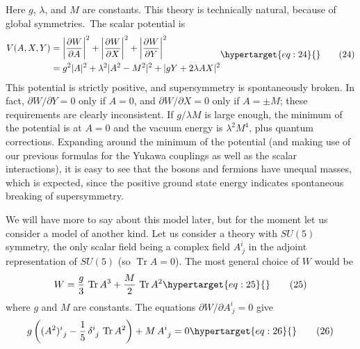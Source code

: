 \documentclass[11pt,a4paper]{article}
\newcommand{\eqtarget}[1]{\hypertarget{eq:#1}{\mathstrut}\tag{#1}}
\begin{document}
Here $g$, $\lambda$, and $M$ are constants. This theory is technically natural,
because of global symmetries.\begingroup\renewcommand{\thefootnote}{\fnsymbol{footnote}}\footnotemark[1]\endgroup\ The scalar potential is
\begin{equation}
\begin{aligned}
V(A, X, Y) &= \left|\frac{\partial W}{\partial A}\right|^2 + \left|\frac{\partial W}{\partial X}\right|^2 + \left|\frac{\partial W}{\partial Y}\right|^2 \\
&= g^2 |A|^2 + \lambda^2 |A^2 - M^2|^2 + |gY + 2 \lambda A X|^2
\end{aligned}
\eqtarget{24}
\end{equation}
This potential is strictly positive, and supersymmetry is spontaneously
broken. In fact, $\partial W/\partial Y = 0$ only if $A = 0$, and $\partial W/\partial X = 0$
only if $A = \pm M$; these requirements are clearly inconsistent. If
$g/\lambda M$ is large enough, the minimum of the potential is at $A = 0$ and
the vacuum energy is $\lambda^2 M^4$, plus quantum corrections. Expanding
around the minimum of the potential (and making use of our previous
formulas for the Yukawa couplings as well as the scalar interactions),
it is easy to see that the bosons and fermions have unequal masses,
which is expected, since the positive ground state energy indicates
spontaneous breaking of supersymmetry.

We will have more to say about this model later, but for the
moment let us consider a model of another kind. Let us consider a
theory with $SU(5)$ symmetry, the only scalar field being a complex
field $A^i_{\ j}$ in the adjoint representation of $SU(5)$ (so $\operatorname{Tr} A = 0$). The
most general choice of $W$ would be
\begin{equation}
W = \frac{g}{3}\, \operatorname{Tr} A^3 + \frac{M}{2}\, \operatorname{Tr} A^2
\eqtarget{25}
\end{equation}
where $g$ and $M$ are constants. The equations $\partial W/\partial A^i_{\ j} = 0$ give
\begin{equation}
g\left((A^2)^i_{\ j} - \frac{1}{5}\, \delta^i_{\ j}\, \operatorname{Tr} A^2\right) + M\, A^i_{\ j} = 0
\eqtarget{26}
\end{equation}

\begingroup
\renewcommand{\thefootnote}{\fnsymbol{footnote}}
\endgroup
\end{document}
